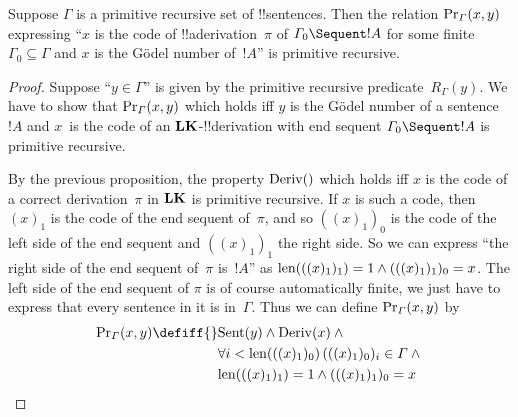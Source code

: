 \documentclass[../../../include/open-logic-section]{subfiles}
\begin{document}
\begin{prop}
Suppose $\Gamma$ is a primitive recursive set of !!{sentence}s.  Then
the relation $\mathrm{Pr}_\Gamma(x, y)$ expressing ``$x$ is the code of
!!a{derivation}~$\pi$ of $\Gamma_0 \Sequent !A$ for some finite
$\Gamma_0 \subseteq \Gamma$ and $x$ is the G\"odel number of~$!A$'' is
primitive recursive.
\end{prop}

\begin{proof}
Suppose ``$y \in \Gamma$'' is given by the primitive recursive
predicate~$R_\Gamma(y)$.  We have to show that $\mathrm{Pr}_\Gamma(x, y)$
which holds iff $y$ is the G\"odel number of a sentence~$!A$ and
$x$~is the code of an $\mathbf{LK}$-!!{derivation} with end sequent
$\Gamma_0 \Sequent !A$ is primitive recursive.

By the previous proposition, the property $\mathrm{Deriv}()$ which holds
iff $x$ is the code of a correct derivation~$\pi$ in $\mathbf{LK}$ is
primitive recursive.  If $x$ is such a code, then $(x)_1$ is the code
of the end sequent of~$\pi$, and so $((x)_1)_0$ is the code of the
left side of the end sequent and $((x)_1)_1$ the right side.  So we can
express ``the right side of the end sequent of~$\pi$ is~$!A$'' as
$\mathrm{len}(((x)_1)_1) = 1 \land (((x)_1)_1)_0 = x$.  The left side of the
end sequent of $\pi$ is of course automatically finite, we just have
to express that every sentence in it is in~$\Gamma$.  Thus we can
define $\mathrm{Pr}_\Gamma(x, y)$ by
\begin{align*}
\fn{Pr}_\Gamma(x, y) \defiff {}&
\fn{Sent}(y) \land \fn{Deriv}(x) \land {} \\
& \lforall[i <
  \len{((x)_1)_0}][(((x)_1)_0)_i \in \Gamma] \land {}\\
& \len{((x)_1)_1} = 1 \land (((x)_1)_1)_0 = x
\end{align*}
\end{proof}
\end{document}
